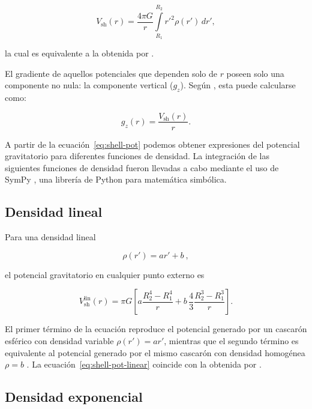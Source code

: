 \begin{subappendices}
\begin{equation}
    V_\text{sh}(r) = \frac{4\pi G}{r}
    \int\limits_{R_1}^{R_2} {r'}^2 \rho(r') \, dr',
\label{eq:shell-pot}
\end{equation}

\noindent la cual es equivalente a la obtenida por \citet[p.62]{binney2008}.

El gradiente de aquellos potenciales que dependen solo de $r$ poseen solo una
componente no nula: la componente vertical ($g_z$).
Según \citet{grombein2013}, esta puede calcularse como:

\begin{equation}
    g_z(r) = \frac{V_\text{sh}(r)}{r}.
\label{eq:shell-gz}
\end{equation}

A partir de la ecuación~\ref{eq:shell-pot} podemos obtener expresiones del
potencial gravitatorio para diferentes funciones de densidad. La integración de
las siguientes funciones de densidad fueron llevadas a cabo mediante el uso de
SymPy \citep{sympy2017}, una librería de Python para matemática simbólica.

\subsection{Densidad lineal}

Para una densidad lineal

\begin{equation}
    \rho(r') = ar' + b\ ,
\end{equation}

\noindent
el potencial gravitatorio en cualquier punto externo es

\begin{equation}
    V_\text{sh}^\text{lin}(r) = \pi G \left[
    a \frac{R_2^4 - R_1^4}{r} +
    b \,\frac{4}{3} \frac{R_2^3 - R_1^3}{r} \right].
    \label{eq:shell-pot-linear}
\end{equation}

\noindent El primer término de la ecuación reproduce el potencial generado por
un cascarón esférico con densidad variable $\rho(r') = ar'$, mientras que el
segundo término es equivalente al potencial generado por el mismo cascarón con
densidad homogénea $\rho = b$ \citep{mikuska2006,grombein2013}.
La ecuación~\ref{eq:shell-pot-linear} coincide con la obtenida por
\citet{lin2019}.

\subsection{Densidad exponencial}


\end{subappendices}

